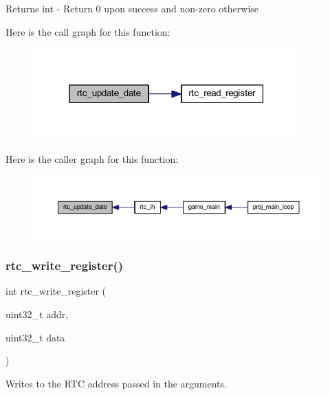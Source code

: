 \begin{DoxyReturn}{Returns}
int -\/ Return 0 upon success and non-\/zero otherwise 
\end{DoxyReturn}
Here is the call graph for this function\+:
\nopagebreak
\begin{figure}[H]
\begin{center}
\leavevmode
\includegraphics[width=291pt]{group__rtc_ga1c7900b102529826ac1662355e6cf058_cgraph}
\end{center}
\end{figure}
Here is the caller graph for this function\+:
\nopagebreak
\begin{figure}[H]
\begin{center}
\leavevmode
\includegraphics[width=350pt]{group__rtc_ga1c7900b102529826ac1662355e6cf058_icgraph}
\end{center}
\end{figure}
\mbox{\label{group__rtc_ga9b5d85527d676067a8c05780ec46d4f1}} 
\subsubsection{\texorpdfstring{rtc\+\_\+write\+\_\+register()}{rtc\_write\_register()}}
{\footnotesize\ttfamily int rtc\+\_\+write\+\_\+register (\begin{DoxyParamCaption}\item[{uint32\+\_\+t}]{addr,  }\item[{uint32\+\_\+t}]{data }\end{DoxyParamCaption})}



Writes to the R\+TC address passed in the arguments. 


